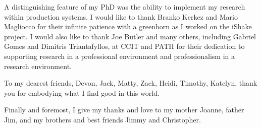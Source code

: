 A distinguishing feature of my PhD was the ability to implement my research within production systems. I would like to thank Branko Kerkez and Mario Magliocco for their infinite patience with a greenhorn as I worked on the iShake project. I would also like to thank Joe Butler and many others, including Gabriel Gomes and Dimitris Triantafyllos, at CCIT and PATH for their dedication to supporting research in a professional environment and professionalism in a research environment.

To my dearest friends, Devon, Jack, Matty, Zack, Heidi, Timothy, Katelyn, thank you for embodying what I find good in this world.

Finally and foremost, I give my thanks and love to my mother Joanne, father Jim, and my brothers and best friends Jimmy and Christopher.